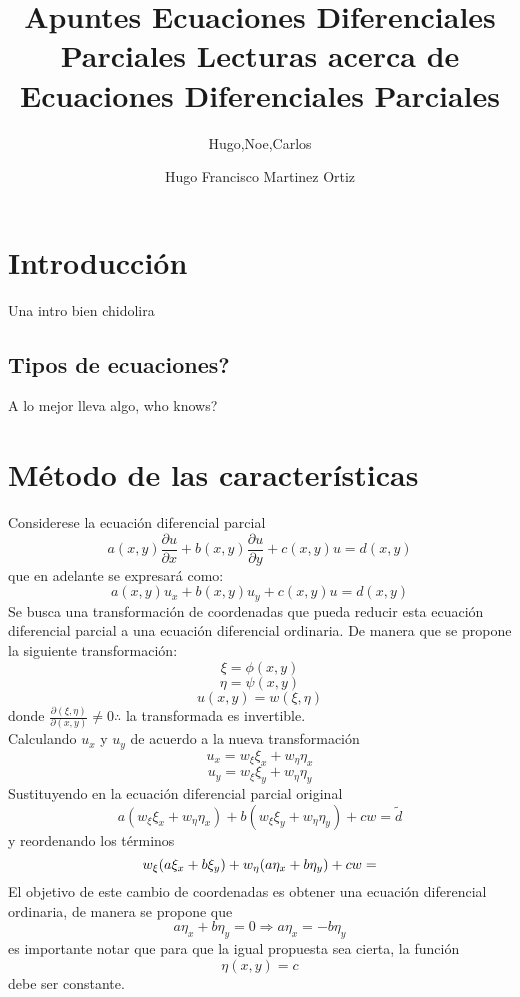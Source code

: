 \documentclass[10pt,spanish,a4paper]{book}
\author{Hugo,Noe,Carlos}
\title{Apuntes Ecuaciones Diferenciales Parciales}
\begin{document}
	\title{%
	Lecturas acerca de Ecuaciones Diferenciales Parciales }
	\author{Hugo Francisco Martinez Ortiz}
	\maketitle
	
	\chapter{Introducción}
		Una intro bien chidolira
		\section{Tipos de ecuaciones?}
		A lo mejor lleva algo, who knows?

	\chapter{Método de las características}
	Considerese la ecuación diferencial parcial
	\[ a(x,y)\frac{\partial u}{\partial x} + b(x,y)\frac{\partial u}{\partial y} + c(x,y)u
	   = d(x,y) \]
	que en adelante se expresará como:
	\[ a(x,y)u_{x} + b(x,y)u_{y} + c(x,y)u
	   = d(x,y) \]
	Se busca una transformación de coordenadas que pueda reducir esta ecuación diferencial parcial a una ecuación diferencial ordinaria. De manera que se propone la siguiente transformación:
	\[\xi = \phi(x,y) \]
	\[\eta = \psi(x,y) \]
	\[u(x,y) = w(\xi,\eta)\]
	donde $\frac{\partial(\xi,\eta)}{\partial(x,y)} \not= 0 \therefore$ la transformada es invertible. \\
	Calculando $u_{x} $ y $ u_{y}$ de acuerdo a la nueva transformación
	\[u_{x} = w_{\xi}\xi_{x} + w_{\eta}\eta_{x}\]
	\[u_{y} = w_{\xi}\xi_{y} + w_{\eta}\eta_{y}\]
	Sustituyendo en la ecuación diferencial parcial original
	\[a(w_{\xi}\xi_{x} + w_{\eta}\eta_{x}) + b(w_{\xi}\xi_{y} + w_{\eta}\eta_{y}) + cw = \tilde{d}\]
	y reordenando los términos
	\[w_{\xi}(a\xi_{x} + b\xi_{y}) + w_{\eta}(a\eta_{x} + b\eta_{y}) + cw = \title{d} \]
	El objetivo de este cambio de coordenadas es obtener una ecuación diferencial ordinaria, de manera se propone que
	\[a\eta_{x} + b\eta_{y} = 0 \Rightarrow a\eta_{x} = -b\eta_{y} \]
	es importante notar que para que la igual propuesta sea cierta, la función
	\[\eta(x,y) = c\]
	debe ser constante.
\end{document}
